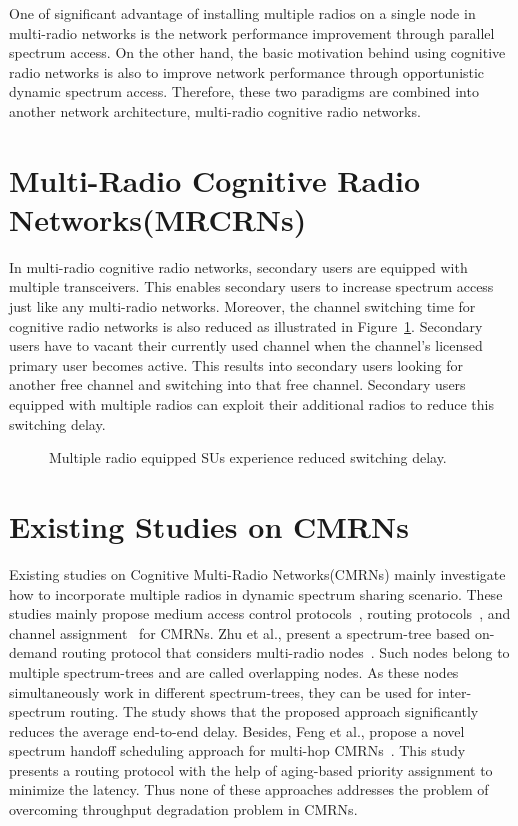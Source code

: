 One of significant advantage of installing multiple radios on a single node in multi-radio networks is the network performance improvement through parallel spectrum access. On the other hand, the basic motivation behind using cognitive radio networks is also to improve network performance through opportunistic dynamic spectrum access. Therefore, these two paradigms are combined into another network architecture, multi-radio cognitive radio networks. 

\section{Multi-Radio Cognitive Radio Networks(MRCRNs)}
In multi-radio cognitive radio networks, secondary users are equipped with multiple transceivers. This enables secondary users to increase spectrum access just like any multi-radio networks. Moreover, the channel switching time for cognitive radio networks is also reduced as illustrated in Figure~\ref{fig:switchingDelay}. Secondary users have to vacant their currently used channel when the channel's licensed primary user becomes active. This results into secondary users looking for another free channel and switching into that free channel. Secondary users equipped with multiple radios can exploit their additional radios to reduce this switching delay.

\begin{figure}[!htbp]
\begin{center}
    
    \caption{Multiple radio equipped SUs experience reduced switching delay.}
    \label{fig:switchingDelay}
\end{center}
\end{figure}


\section{Existing Studies on CMRNs}
Existing studies on Cognitive Multi-Radio Networks(CMRNs) mainly investigate how to incorporate multiple radios in dynamic spectrum sharing scenario. These studies mainly propose medium access control protocols~\cite{cormio2009survey, de2012survey}, routing protocols~\cite{zhu2008stod, feng2009joint}, and channel assignment~\cite{ahmadi2012distributed, zhong2014capacity} for CMRNs. Zhu et al., present a spectrum-tree based on-demand routing protocol that considers multi-radio nodes~\cite{zhu2008stod}. Such nodes belong to multiple spectrum-trees and are called overlapping nodes. As these nodes simultaneously work in different spectrum-trees, they can be used for inter-spectrum routing. The study shows that the proposed approach significantly reduces the average end-to-end delay.  Besides, Feng et al., propose a novel spectrum handoff scheduling approach for multi-hop CMRNs~\cite{feng2009joint}. This study presents a routing protocol with the help of aging-based priority assignment to minimize the latency. Thus none of these approaches addresses the problem of overcoming throughput degradation problem in CMRNs.

